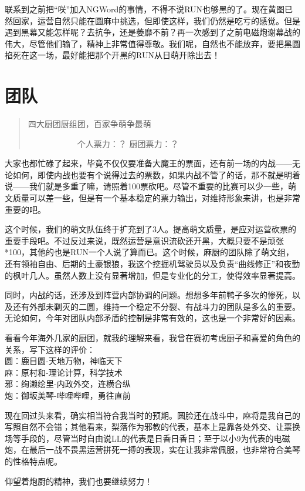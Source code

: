 联系到之前把“咲”加入NGWord的事情，不得不说RUN也够黑的了。现在黄图已然回家，运营自然只能在圆麻中挑选，但即使这样，我们仍然是吃亏的感觉。但是遇到黑幕又能怎样呢？去抗争，还是萎靡不前？再一次感到了之前电磁炮谢幕战的伟大，尽管他们输了，精神上非常值得尊敬。我们呢，自然也不能放弃，要把黑圆掐死在这一场，最好能把那个开黑的RUN从日萌开除出去！


\chapter{团队}
\begin{quote}
四大厨团厨组团，百家争萌争最萌

　　　　　　个人票力：？ 厨团票力：？
\end{quote}

大家也都忙碌了起来，毕竟不仅仅要准备大魔王的票面，还有前一场的内战——无论如何，即使内战也要有个说得过去的票数，如果内战不管了的话，那不就是明着说——我们就是多重了嘛，请照着100票砍吧。尽管不重要的比赛可以少一些，萌文质量可以差一些，但是有一个基本稳定的票力输出，对维持形象来讲，也是非常重要的吧。

这个时候，我们的萌文队伍终于扩充到了3人。提高萌文质量，是应对运营砍票的重要手段吧。不过反过来说，既然运营是意识流砍还开黑，大概只要不是顽张*100，其他的也是RUN一个人说了算而已。这个时候，麻厨的团队除了萌文组，还有领袖自由、后期的土豪银狼，我这个挖掘机驾驶员以及负责“曲线修正”和夜勤的枫叶几人。虽然人数上没有显著增加，但是专业化的分工，使得效率显著提高。

同时，内战的话，还涉及到阵营内部协调的问题。想想多年前鸭子多次的惨死，以及还有外部未剿灭的二圆，维持一个稳定不分裂、有战斗力的团队是多么的重要。无论如何，今年对团队内部矛盾的控制是非常有效的，这也是一个非常好的因素。

看看今年海外几家的厨团，就我的理解来看，我曾在赛初考虑厨子和喜爱的角色的关系，写下这样的评价：\\
圆：鹿目圆-天地万物，神临天下\\
麻：原村和-理论计算，科学技术\\
邪：绚濑绘里-内政外交，连横合纵\\
炮：御坂美琴-哔哩哔哩，勇往直前

现在回过头来看，确实相当符合我当时的预期。圆脸还在战斗中，麻将是我自己的写照自然不会错；其他看来，梨落作为邪教的代表，基本上是靠各处外交、让票换场等手段的，尽管当时自由说LL的代表是日香日香日；至于以小9为代表的电磁炮，在最后一战不畏黑运营拼死一搏的表现，实在让我非常佩服，也非常符合美琴的性格特点呢。

仰望着炮厨的精神，我们也要继续努力！


